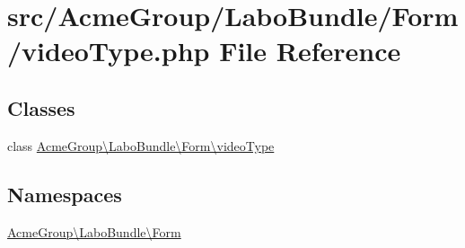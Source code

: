 \hypertarget{video_type_8php}{\section{src/\+Acme\+Group/\+Labo\+Bundle/\+Form/video\+Type.php File Reference}
\label{video_type_8php}
}
\subsection*{Classes}
\begin{DoxyCompactItemize}
\item 
class \hyperlink{class_acme_group_1_1_labo_bundle_1_1_form_1_1video_type}{Acme\+Group\textbackslash{}\+Labo\+Bundle\textbackslash{}\+Form\textbackslash{}video\+Type}
\end{DoxyCompactItemize}
\subsection*{Namespaces}
\begin{DoxyCompactItemize}
\item 
 \hyperlink{namespace_acme_group_1_1_labo_bundle_1_1_form}{Acme\+Group\textbackslash{}\+Labo\+Bundle\textbackslash{}\+Form}
\end{DoxyCompactItemize}
